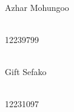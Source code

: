 \begin{titlepage}
\begin{center}
		
		\begin{minipage}{0.4\textwidth}
			\begin{flushleft} \large
				\emph{} \\
				Azhar {Mohungoo }
			\end{flushleft}
		\end{minipage}
		\begin{minipage}{0.4\textwidth}
			\begin{flushright} \large
				\emph{} \\
				12239799
			\end{flushright}
		\end{minipage}
		
		
		\begin{minipage}{0.4\textwidth}
			\begin{flushleft} \large
				\emph{} \\
				Gift {Sefako }
			\end{flushleft}
		\end{minipage}
		\begin{minipage}{0.4\textwidth}
			\begin{flushright} \large
				\emph{} \\
				12231097
			\end{flushright}
		\end{minipage}
		
	\end{center}
\end{titlepage}